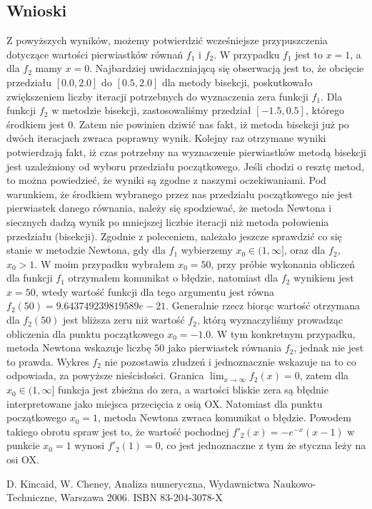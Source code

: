 \documentclass{article}
\begin{document}
\begin{center}
    \subsection{Wnioski}
    \large Z powyższych wyników, możemy potwierdzić wcześniejsze przypuszczenia dotyczące wartości pierwiastków równań \(f_{1}\) i \(f_{2}\).
     W przypadku \(f_{1}\) jest to \(x=1\), a dla \(f_{2}\) mamy \(x=0\). Najbardziej uwidaczniającą się obserwacją jest to, że obcięcie przedziału \([0.0, 2.0]\) do \([0.5, 2.0]\)
     dla metody bisekcji, poskutkowało zwiększeniem liczby iteracji potrzebnych do wyznaczenia zera funkcji \(f_{1}\).
     Dla funkcji \(f_{2}\) w metodzie bisekcji, zastosowaliśmy przedział \([-1.5, 0.5]\), którego środkiem jest \(0\). Zatem nie powinien dziwić nas fakt, iż
     metoda bisekcji już po dwóch iteracjach zwraca poprawny wynik. Kolejny raz otrzymane wyniki potwierdzają fakt, iż czas potrzebny na wyznaczenie pierwiastków metodą bisekcji jest uzależniony od wyboru przedziału początkowego.
     Jeśli chodzi o resztę metod, to można powiedzieć, że wyniki są zgodne z naszymi oczekiwaniami. 
     Pod warunkiem, że środkiem wybranego przez nas przedziału początkowego nie jest pierwiastek danego równania, należy się spodziewać, że metoda Newtona i siecznych dadzą wynik po mniejszej liczbie iteracji niż metoda połowienia przedziału (bisekcji). Zgodnie z poleceniem, należało jeszcze sprawdzić co się stanie w metodzie Newtona, gdy dla \(f_{1}\) wybierzemy \(x_{0} \in (1, \infty]\), oraz dla \(f_{2}\),
     \(x_{0} > 1\). W moim przypadku wybrałem \(x_{0} = 50\), przy próbie wykonania obliczeń dla funkcji
     \(f_{1}\) otrzymałem komunikat o błędzie, natomiast dla \(f_{2}\) wynikiem jest \(x=50\), wtedy wartość funkcji dla tego argumentu jest równa \(f_{2}(50) = 9.643749239819589e-21\). Generalnie rzecz biorąc wartość otrzymana dla \(f_{2}(50)\) jest bliższa zeru niż wartość \(f_{2}\), którą wyznaczyliśmy prowadząc obliczenia dla punktu początkowego \(x_{0} =-1.0\). W tym konkretnym przypadku, metoda Newtona 
     wskazuje liczbę \(50\) jako pierwiastek równania \(f_{2}\), jednak nie jest to prawda. Wykres \(f_{2}\) nie pozostawia złudzeń i jednoznacznie wskazuje na to co odpowiada, za powyższe nieścisłości. 
     Granica \(\lim_{x \to \infty}f_{2}(x) = 0\), zatem dla \(x_{0} \in (1, \infty]\) funkcja jest zbieżna do zera, a wartości bliskie zera są błędnie interpretowane jako miejsca przecięcia z osią OX. 
     Natomiast dla punktu początkowego \(x_{0}=1\), metoda Newtona zwraca komunikat o błędzie.
     Powodem takiego obrotu spraw jest to, że wartość pochodnej \(f'_{2}(x) = -e^{-x}(x-1)\) 
     w punkcie \(x_{0} = 1\) wynosi \(f'_{2}(1) = 0\), co jest jednoznaczne z tym że styczna leży na osi OX.
    \end{center}
    \begin{thebibliography}{100}
         D. Kincaid, W. Cheney, Analiza numeryczna, Wydawnictwa Naukowo-Techniczne, Warszawa 2006. ISBN 83-204-3078-X
    \end{thebibliography}
\end{document}
